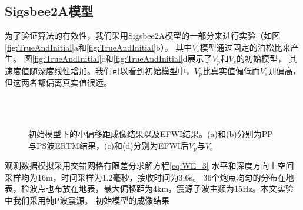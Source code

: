 \subsection{Sigsbee2A模型}
为了验证算法的有效性，我们采用Sigsbee2A模型的一部分来进行实验（如图\ref{fig:TrueAndInitial}a和\ref{fig:TrueAndInitial}b）。
其中$V_s$模型通过固定的泊松比来产生。
图\ref{fig:TrueAndInitial}c和\ref{fig:TrueAndInitial}d展示了$V_p$和$V_s$的初始模型，
其速度值随深度线性增加。我们可以看到初始模型中，$V_p$比真实值偏低而$V_s$则偏高，
但这两者都偏离真实值很远。
\begin{figure}[!htb]
   \centering
   \\
   \\
   \caption{初始模型下的小偏移距成像结果以及EFWI结果。(a)和(b)分别为PP与PS波ERTM结果，(c)和(d)分别为EFWI后$V_p$与$V_s$}
   \label{fig:Results_init}
\end{figure}
观测数据模拟采用交错网格有限差分求解方程\ref{eq:WE_3}
水平和深度方向上空间采样均为16m，时间采样为1.2毫秒，接收时间为3.6s。
36个炮点均匀的分布在地表，检波点也布放在地表，最大偏移距为4km，震源子波主频为15Hz。本文实验中我们采用纯P波震源。
初始模型的成像结果

